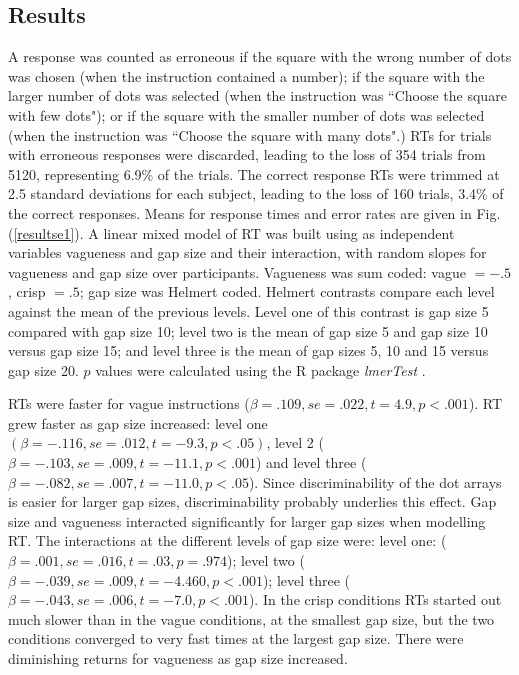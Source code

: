 \documentclass[graybox,envcountchap,sectrefs%
,footinfo
]{svmono}
\begin{document}
\subsection{Results}

A response was counted as erroneous if the square with the wrong number of dots was chosen (when the instruction contained a number); if the square with the larger number of dots was selected (when the instruction was ``Choose the square with few dots"); or if the square with the smaller number of dots was selected (when the instruction was ``Choose the square with many dots".) %
RTs for trials with erroneous responses were discarded, leading to the loss of 354 trials from 5120, representing 6.9\% of the trials. The correct response RTs were trimmed at 2.5 standard deviations for each subject, leading to the loss of 160 trials, 3.4\% of the correct responses. Means for response times and error rates are given in Fig. (\ref{resultse1}).
A linear mixed model of RT was built using as independent variables vagueness and gap size and their interaction, with random slopes for vagueness and gap size over participants. Vagueness was sum coded: vague $= -.5$, crisp $= .5$; gap size was Helmert coded. Helmert contrasts compare each level against the mean of the previous levels. Level one of this contrast is gap size 5 compared with gap size 10; level two is the mean of gap size 5 and gap size 10 versus gap size 15; and level three is the mean of gap sizes 5, 10 and 15 versus gap size 20. 
$p$ values were calculated using the R package \emph{lmerTest} \cite{lmerTest}.

RTs were faster for vague instructions ($\beta=.109, se=.022, t=4.9, p<.001$). 
%
RT grew faster as gap size increased: level one $(\beta=-.116, se=.012, t=-9.3, p<.05)$, level 2 ($\beta=-.103, se=.009, t=-11.1, p<.001$) and level three ($\beta=-.082, se=.007, t=-11.0, p<.05$). Since discriminability of the dot arrays is easier for larger gap sizes, discriminability probably underlies this effect. Gap size and vagueness interacted significantly for larger gap sizes when modelling RT. %
The interactions at the different levels of gap size were: level one: ($\beta=.001, se=.016, t=.03, p=.974$); level two ($\beta=-.039, se=.009, t=-4.460, p<.001$); level three ($\beta=-.043, se=.006,t=-7.0, p<.001$). In the crisp conditions RTs started out much slower than in the vague conditions, at the smallest gap size, but the two conditions converged to very fast times at the largest gap size. There were diminishing returns for vagueness as gap size increased. 
\end{document}
